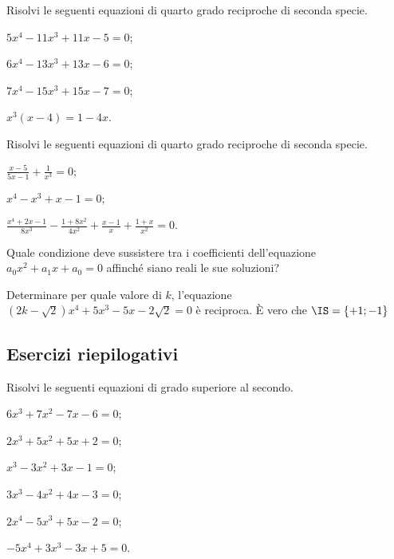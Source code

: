 \begin{esercizio}[\Ast]
 \label{ese:5.48}
Risolvi le seguenti equazioni di quarto grado reciproche di seconda specie.
\begin{multicols}{2}
\begin{enumeratea}
\item $5x^4-11x^3+11x-5=0$;
\item $6x^4-13x^3+13x-6=0$;
\item $7x^4-15x^3+15x-7=0$;
\item $x^3(x-4)=1-4x$.
\end{enumeratea}
\end{multicols}
\end{esercizio}

\begin{esercizio}[\Ast]
 \label{ese:5.49}
Risolvi le seguenti equazioni di quarto grado reciproche di seconda specie.
\begin{multicols}{2}
\begin{enumeratea}
\item $\frac{x-5}{5x-1}+\frac 1{x^3}=0$;
\item $x^4-x^3+x-1=0$;
\item $\frac{x^4+2x-1}{8x^3}-\frac{1+8x^2}{4x^2}+\frac{x-1} x+\frac{1+x}{x^2}=0$.
\end{enumeratea}
\end{multicols}
\end{esercizio}

\begin{esercizio}
 \label{ese:5.50}
Quale condizione deve sussistere tra i coefficienti dell’equazione $a_0x^2+a_1x+a_0=0$ affinché siano reali le sue soluzioni?
\end{esercizio}

\begin{esercizio}[\Ast]
 \label{ese:5.51}
Determinare per quale valore di $k$, l’equazione $\left(2k-\sqrt 2\right)x^4+5x^3-5x-2\sqrt 2=0$ è reciproca. È vero che $\IS=\{+1;-1\}$
\end{esercizio}
\newpage
\subsection{Esercizi riepilogativi}

\begin{esercizio}[\Ast] %
Risolvi le seguenti equazioni di grado superiore al secondo.
\begin{multicols}{2}
\begin{enumeratea}
\item $6x^3+7x^2-7x-6=0$;
\item $2x^3+5x^2+5x+2=0$;
\item $x^3-3x^2+3x-1=0$;
\item $3x^3-4x^2+4x-3=0$;
\item $2x^4-5x^3+5x-2=0$;
\item $-5x^4+3x^3-3x+5=0$.
\end{enumeratea}
\end{multicols}
\end{esercizio}


